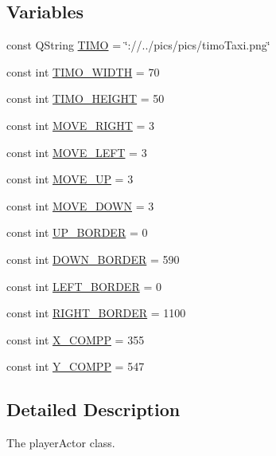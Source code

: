 \subsection*{Variables}
\begin{DoxyCompactItemize}
\item 
const Q\-String \hyperlink{playeractor_8hh_a107557147f68a15ce055ad192fe2dcda}{T\-I\-M\-O} = \char`\"{}\-://../pics/pics/timo\-Taxi.\-png\char`\"{}
\item 
const int \hyperlink{playeractor_8hh_a48ccf4cb22b8c34182df5bd049684e31}{T\-I\-M\-O\-\_\-\-W\-I\-D\-T\-H} = 70
\item 
const int \hyperlink{playeractor_8hh_a7b95d2de637959a7a822bfe698f29047}{T\-I\-M\-O\-\_\-\-H\-E\-I\-G\-H\-T} = 50
\item 
const int \hyperlink{playeractor_8hh_a7ff2cd4973a888898e16cec021471cb6}{M\-O\-V\-E\-\_\-\-R\-I\-G\-H\-T} = 3
\item 
const int \hyperlink{playeractor_8hh_a8b5763eba7d0e96a8495f2228f98c217}{M\-O\-V\-E\-\_\-\-L\-E\-F\-T} = 3
\item 
const int \hyperlink{playeractor_8hh_a42627545a06762bd7f491644d983be42}{M\-O\-V\-E\-\_\-\-U\-P} = 3
\item 
const int \hyperlink{playeractor_8hh_a487f5793a83001a0b4461c9b3bbe70e6}{M\-O\-V\-E\-\_\-\-D\-O\-W\-N} = 3
\item 
const int \hyperlink{playeractor_8hh_a08f59809094a3224cf5f1e9daa337f83}{U\-P\-\_\-\-B\-O\-R\-D\-E\-R} = 0
\item 
const int \hyperlink{playeractor_8hh_ab70ae800f7779ed0cedcfbb0e808720b}{D\-O\-W\-N\-\_\-\-B\-O\-R\-D\-E\-R} = 590
\item 
const int \hyperlink{playeractor_8hh_a37cd68863d450a90adaea05f765f1b50}{L\-E\-F\-T\-\_\-\-B\-O\-R\-D\-E\-R} = 0
\item 
const int \hyperlink{playeractor_8hh_a9ca2467606fd5574d4852978052b5103}{R\-I\-G\-H\-T\-\_\-\-B\-O\-R\-D\-E\-R} = 1100
\item 
const int \hyperlink{playeractor_8hh_ab64175cb6a0641605a4f41d4458f53a0}{X\-\_\-\-C\-O\-M\-P\-P} = 355
\item 
const int \hyperlink{playeractor_8hh_a3e65f157b7d6cfe2462c18e28aadd7ad}{Y\-\_\-\-C\-O\-M\-P\-P} = 547
\end{DoxyCompactItemize}


\subsection{Detailed Description}
The player\-Actor class. 


